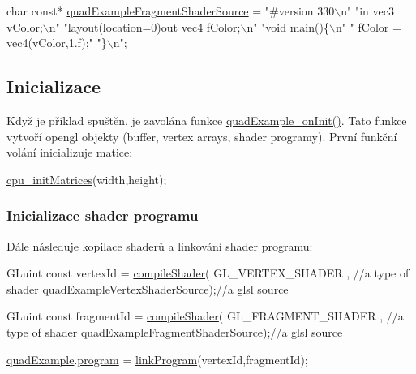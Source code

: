 \begin{DoxyCodeInclude}
\textcolor{keywordtype}{char} \textcolor{keyword}{const}* \hyperlink{quadExample_8c_a0ac50d89d2665b7f77595f36071c8ffc}{quadExampleFragmentShaderSource} = 
\textcolor{stringliteral}{"#version 330\(\backslash\)n"}
\textcolor{stringliteral}{"in vec3 vColor;\(\backslash\)n"}
\textcolor{stringliteral}{"layout(location=0)out vec4 fColor;\(\backslash\)n"}
\textcolor{stringliteral}{"void main()\{\(\backslash\)n"}
\textcolor{stringliteral}{"  fColor = vec4(vColor,1.f);"}
\textcolor{stringliteral}{"\}\(\backslash\)n"};
\end{DoxyCodeInclude}
\hypertarget{quadExample.c_Initialization}{}\subsection{Inicializace}\label{quadExample.c_Initialization}
Když je příklad spuštěn, je zavolána funkce \hyperlink{quadExample_8c_ae9e7b1446d0269014f3f3d33df3f0da0}{quad\-Example\-\_\-on\-Init()}. Tato funkce vytvoří opengl objekty (buffer, vertex arrays, shader programy). První funkční volání inicializuje matice\-: 
\begin{DoxyCodeInclude}
  \hyperlink{mouseCamera_8c_a7e7e918a9328502b7c35cfbbdb068b7b}{cpu\_initMatrices}(width,height);
\end{DoxyCodeInclude}
\hypertarget{quadExample.c_ShaderProgram}{}\subsubsection{Inicializace shader programu}\label{quadExample.c_ShaderProgram}
Dále následuje kopilace shaderů a linkování shader programu\-: 
\begin{DoxyCodeInclude}
  GLuint \textcolor{keyword}{const} vertexId = \hyperlink{program_8h_aeeb65abe90cc1be97e5788afe8ca57a7}{compileShader}(
      GL\_VERTEX\_SHADER             , \textcolor{comment}{//a type of shader}
      quadExampleVertexShaderSource);\textcolor{comment}{//a glsl source}

  GLuint \textcolor{keyword}{const} fragmentId = \hyperlink{program_8h_aeeb65abe90cc1be97e5788afe8ca57a7}{compileShader}(
      GL\_FRAGMENT\_SHADER             , \textcolor{comment}{//a type of shader}
      quadExampleFragmentShaderSource);\textcolor{comment}{//a glsl source}

  \hyperlink{quadExample_8c_ad961415145a9c30bd9846d4a278cc63a}{quadExample}.\hyperlink{structQuadExampleVariables_a63971781ff860bd201886926f943ba78}{program} = \hyperlink{program_8h_af917a75fb9e573fb52d85ef90f32231e}{linkProgram}(vertexId,fragmentId);
\end{DoxyCodeInclude}
